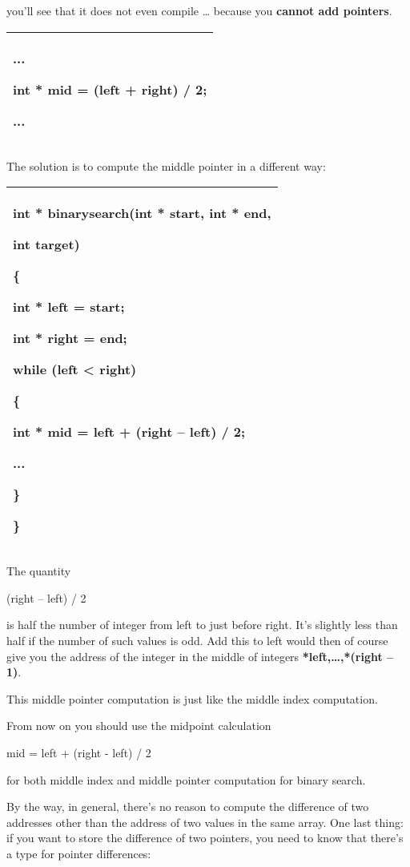 \documentclass[
]{article}
\begin{document}
you'll see that it does not even compile \ldots{} because you
\textbf{cannot add pointers}.

\begin{longtable}[]{@{}l@{}}
\toprule
\endhead
\begin{minipage}[t]{0.97\columnwidth}\raggedright
...

int * mid = (left \textbf{+} right) / 2;

...\strut
\end{minipage}\tabularnewline
\bottomrule
\end{longtable}

The solution is to compute the middle pointer in a different way:

\begin{longtable}[]{@{}l@{}}
\toprule
\endhead
\begin{minipage}[t]{0.97\columnwidth}\raggedright
int * binarysearch(int * start, int * end,

int target)

\{

int * left = start;

int * right = end;

while (left \textless{} right)

\{

int * mid = left + (right -- left) / 2;

...

\}

\}\strut
\end{minipage}\tabularnewline
\bottomrule
\end{longtable}

The quantity

(right -- left) / 2

is half the number of integer from left to just before right. It's
slightly less than half if the number of such values is odd. Add this to
left would then of course give you the address of the integer in the
middle of integers \textbf{*left,\ldots,*(right -- 1)}.

This middle pointer computation is just like the middle index
computation.

From now on you should use the midpoint calculation

mid = left + (right - left) / 2

for both middle index and middle pointer computation for binary search.

By the way, in general, there's no reason to compute the difference of
two addresses other than the address of two values in the same array.
One last thing: if you want to store the difference of two pointers, you
need to know that there's a type for pointer differences:
\end{document}
